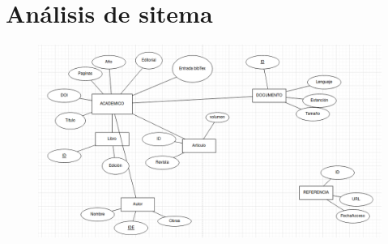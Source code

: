 \chapter{Análisis de sitema}
\begin{figure}[H]
\centering
\includegraphics[scale=0.7]{images/entidadRelacion}
\end{figure}

